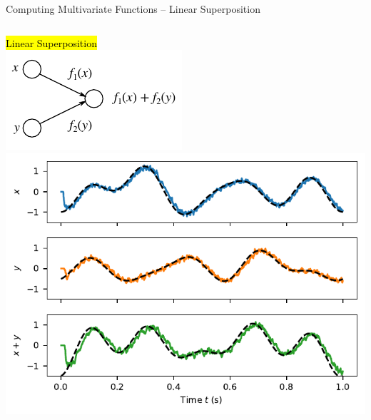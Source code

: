 \documentclass[handout,aspectratio=169]{beamer}
\begin{document}
	\begin{frame}{Computing Multivariate Functions -- Linear Superposition}
		\begin{columns}[c]
			\centering
			\hl{Linear Superposition}\\[0.25cm]
			\includegraphics{media/network_a.pdf}
			\includegraphics[width=\textwidth]{media/multivariate_addition.pdf}
		\end{columns}
 	\end{frame}
\end{document}
